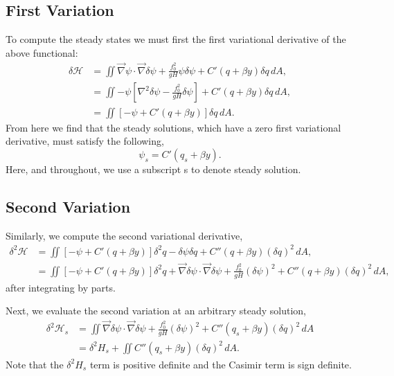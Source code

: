 \documentclass[12pt]{article}
\begin{document}
{    \subsection{First Variation}{
        To compute the steady states we must first the first variational derivative of the above functional:
        \begin{align*}
            \delta \mathcal{H}
            & = \iint \vec\nabla\psi \cdot \vec\nabla \delta \psi + \frac{f_0^2}{g H} \psi \delta \psi + C'(q + \beta y) \delta q \, dA, \\
            & = \iint -\psi \left[ \nabla^2 \delta \psi - \frac{f_0^2}{g H} \delta \psi \right]  + C'(q + \beta y) \delta q \, dA, \\
            & = \iint \left[ - \psi + C'(q + \beta y) \right]  \delta q  \, dA.
        \end{align*}
        From here we find that the steady solutions, which have a zero first variational derivative, must satisfy the following,
        $$
        \psi_s = C'(q_s + \beta y).
        $$
        Here, and throughout, we use a subscript s to denote steady solution.
    }

    \subsection{Second Variation}{
      Similarly, we compute the second variational derivative,
      \begin{align*}
          \delta^2 \mathcal{H}
          & = \iint \left[ - \psi + C'(q + \beta y) \right]  \delta^2 q  - \delta \psi \delta q +  C''(q + \beta y) (\delta q)^2  \, dA, \\
          & = \iint \left[ - \psi + C'(q + \beta y) \right]  \delta^2 q
          + \vec\nabla \delta \psi \cdot \vec \nabla \delta \psi
          +\frac{f_0^2}{gH} (\delta \psi)^2+  C''(q + \beta y) (\delta q)^2  \, dA,
      \end{align*}
      after integrating by parts.

      Next, we evaluate the second variation at an arbitrary steady solution,
      \begin{align*}
          \delta^2 \mathcal{H}_s
          & = \iint \vec\nabla \delta \psi \cdot \vec \nabla \delta \psi + \frac{f_0^2}{gH} (\delta \psi)^2+  C''(q_s + \beta y) (\delta q)^2  \, dA \\
          & = \delta^2 H_s + \iint C''(q_s + \beta y) (\delta q)^2  \, dA.
      \end{align*}
      Note that the $\delta^2 H_s$ term is positive definite and the Casimir term is sign definite.
    }
}
\end{document}
